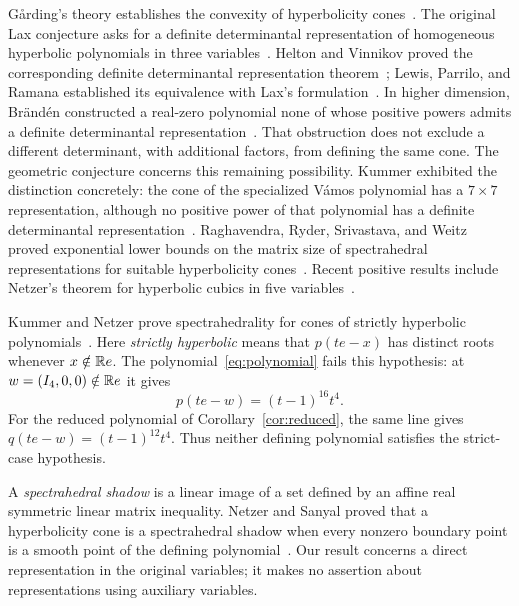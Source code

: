 G\aa rding's theory establishes the convexity of hyperbolicity
cones~\cite{garding-1959}. The original Lax conjecture asks for a
definite determinantal representation of homogeneous hyperbolic polynomials in three
variables~\cite{lax-1958}. Helton and Vinnikov proved the corresponding
definite determinantal representation theorem~\cite{helton-vinnikov-2007};
Lewis, Parrilo, and Ramana established its equivalence with Lax's
formulation~\cite{lewis-parrilo-ramana-2005}. In higher dimension, Br\"and\'en
constructed a real-zero polynomial none of whose positive powers admits
a definite determinantal representation~\cite[Theorem~3.3]{branden-2011}.
That obstruction does not exclude a different determinant, with additional
factors, from defining the same cone. The geometric conjecture concerns this remaining
possibility. Kummer exhibited the distinction concretely: the cone of
the specialized V\'amos polynomial has a $7\times7$ representation,
although no positive power of that polynomial has a definite
determinantal representation~\cite[Section~3]{kummer-2016-vamos}.
Raghavendra, Ryder, Srivastava, and Weitz proved exponential
lower bounds on the matrix size of spectrahedral representations for
suitable hyperbolicity cones~\cite{raghavendra-ryder-srivastava-2018}.
Recent positive results include Netzer's theorem for
hyperbolic cubics in five variables~\cite[Theorem~3.9]{netzer-2026}.

Kummer and Netzer prove spectrahedrality for cones of strictly
hyperbolic polynomials~\cite[Theorem~1]{kummer-netzer-2026-strict}.
Here \emph{strictly hyperbolic} means that $p(te-x)$ has distinct roots
whenever $x\notin\mathbb R e$. The polynomial~\eqref{eq:polynomial} fails this
hypothesis: at $w=(I_4,0,0)\notin\mathbb R e$ it gives
\[
 p(te-w)=(t-1)^{16}t^4.
\]
For the reduced polynomial of Corollary~\ref{cor:reduced}, the same line
gives $q(te-w)=(t-1)^{12}t^4$. Thus neither defining polynomial satisfies
the strict-case hypothesis.

A \emph{spectrahedral shadow} is a linear image of a set defined by an
affine real symmetric linear matrix inequality.
Netzer and Sanyal proved that a hyperbolicity cone is a spectrahedral
shadow when every nonzero boundary point is a smooth point of the
defining polynomial~\cite[Theorem~1.1]{netzer-sanyal-2015}.
Our result concerns a direct representation in the original variables;
it makes no assertion about representations using auxiliary variables.

